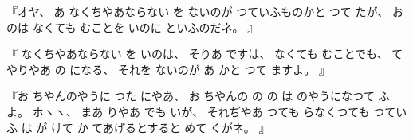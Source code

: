 %
『オヤ、
%
あ
なくちやあならない
を
ないのが
つていふものかと
つて
たが、
%
お
のは
なくても
むことを
いのに
といふのだネ。
』

%
『
なくちやあならない
を
いのは、
%
そりあ
ですは、
%
なくても
むことでも、
%
てやりやあ
の
になる、
%
それを
ないのが
あ
かと
つて
ますよ。
』

%
『お
ちやんのやうに
つた
にやあ、
%
お
ちやんの
の
の
は
のやうになつて
ふよ。
%
ホヽヽ、
%
まあ
りやあ
でも
いが、
%
それぢやあ
つても
らなくつても
つていふ
は
が
けて
か
てあげるとすると
めて
くがネ。
』
